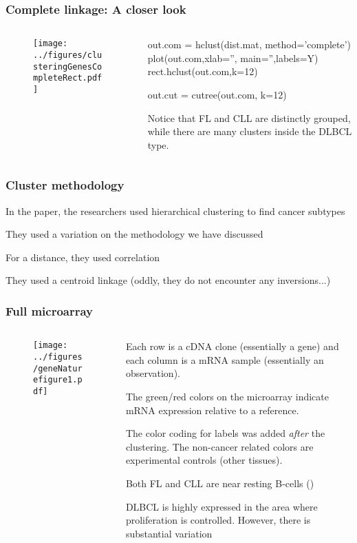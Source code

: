 \documentclass{beamer}
\begin{document}
\begin{frame}[fragile]
\frametitle{Complete linkage: A closer look}
\begin{columns}[T]
\begin{column}{.55\textwidth}
\begin{figure}
\centering
  \texttt{[image: ../figures/clusteringGenesCompleteRect.pdf]} 
\end{figure}
\end{column}
\begin{column}{.45\textwidth} 
\vsp
\vsp
\vsp

\begin{blockcode}
out.com = hclust(dist.mat,
     method='complete')
plot(out.com,xlab='',
   main='',labels=Y)
rect.hclust(out.com,k=12)

out.cut = cutree(out.com,
         k=12)
\end{blockcode}
Notice that FL and CLL are distinctly grouped, while there are many clusters inside the DLBCL type.
\end{column}
\end{columns}
\end{frame}

\begin{frame}[fragile]
\frametitle{Cluster methodology}
In the paper, the researchers used hierarchical clustering to find cancer subtypes
\vsp

They used a variation on the methodology we have discussed

\vsp 
For a distance, they used correlation

\vsp
They used a centroid linkage (oddly, they do not encounter any inversions...)
\end{frame}


\begin{frame}[fragile]
\frametitle{Full microarray}
\begin{columns}[T]
\begin{column}{.6\textwidth}
\begin{figure}
\centering
  \texttt{[image: ../figures/geneNaturefigure1.pdf]} 
\end{figure}
\end{column}
\begin{column}{.4\textwidth} 
\scriptsize
\vsp
\vsp

\vsp
Each row is a cDNA clone (essentially a gene) and each column
is a mRNA sample (essentially an observation).

\vsp
The green/red colors on the microarray indicate mRNA expression relative to a reference.

\vsp
The color coding for labels was added {\it after} the clustering.  The non-cancer related colors are 
experimental controls (other tissues).

\vsp
Both FL and CLL are near resting B-cells ()

\vsp
DLBCL is highly expressed in the area where proliferation is controlled.  However, there is
substantial variation
\end{column}
\end{columns}
\end{frame}
\end{document}
